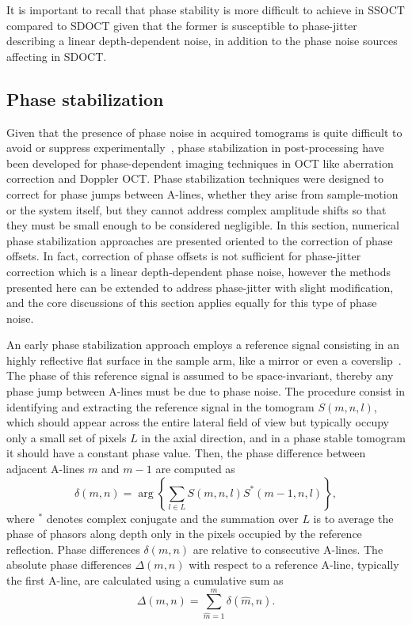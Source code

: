 It is important to recall that phase stability is more difficult to achieve in SSOCT compared to SDOCT given that the former is susceptible to phase-jitter describing a linear depth-dependent noise, in addition to the phase noise sources affecting in SDOCT.

\FloatBarrier

\subsection{Phase stabilization}\label{sec:phaseStabilization}

Given that the presence of phase noise in acquired tomograms is quite difficult to avoid or suppress experimentally~\cite{Adie2015_Interferometric}, phase stabilization in post-processing have been developed for phase-dependent imaging techniques in OCT like aberration correction and Doppler OCT. Phase stabilization techniques were designed to correct for phase jumps between A-lines, whether they arise from sample-motion or the system itself, but they cannot address complex amplitude shifts so that they must be small enough to be considered negligible. In this section, numerical phase stabilization approaches are presented oriented to the correction of phase offsets. In fact, correction of phase offsets is not sufficient for phase-jitter correction which is a linear depth-dependent phase noise, however the methods presented here can be extended to address phase-jitter with slight modification, and the core discussions of this section applies equally for this type of phase noise.

An early phase stabilization approach employs a reference signal consisting in an highly reflective flat surface in the sample arm, like a mirror or even a coverslip~\cite{Ralston2006_Phase, Yang2001_Phasereferenced}. The phase of this reference signal is assumed to be space-invariant, thereby any phase jump between A-lines must be due to phase noise. The procedure consist in identifying and extracting the reference signal in the tomogram $S(m,n,l)$, which should appear across the entire lateral field of view but typically occupy only a small set of pixels $L$ in the axial direction, and in a phase stable tomogram it should have a constant phase value. Then, the phase difference between adjacent A-lines $m$ and $m-1$ are computed as
\begin{equation}\label{eq:PhaseDiff}
	\delta(m,n) = \arg\left\{\sum_{l\in L} S(m,n,l)S^*(m-1,n,l)\right\},
\end{equation}
where $^*$ denotes complex conjugate and the summation over $L$ is to average the phase of phasors along depth only in the pixels occupied by the reference reflection. Phase differences $\delta(m,n)$ are relative to consecutive A-lines. The absolute phase differences $\Delta(m,n)$ with respect to a reference A-line, typically the first A-line, are calculated using a cumulative sum as
\begin{equation} \label{eq:absPhaseDiff}
	\Delta(m,n) = \sum_{\hat{m}=1}^m \delta(\hat{m},n).
\end{equation}


